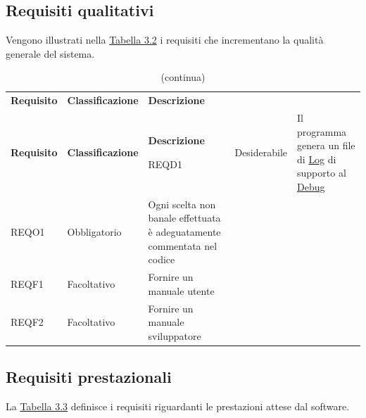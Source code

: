 \newpage
\subsection{Requisiti qualitativi}

Vengono illustrati nella \hyperref[3.2]{Tabella 3.2} i requisiti che incrementano la qualità generale del sistema.


\begin{longtable}{ >{\centering}p{} >{\centering}p{}
		>{\raggedright}p{} >{\centering}p{}}
	\caption{Tabella dei requisiti qualitativi}
	\label{3.2}
	\\
	\rowcolorhead 
	\textbf{\color{white}Requisito} 
	& \textbf{\color{white}Classificazione} 
	& \centering\textbf{\color{white}Descrizione}
	 
	\endfirsthead
	\caption[]{(continua)}\\
	\rowcolorhead 
	\textbf{\color{white}Requisito} 
	& \textbf{\color{white}Classificazione} 
	& \centering\textbf{\color{white}Descrizione}
	
	\endhead	
	
	REQD1	&	Desiderabile	&	Il programma genera un file di \hyperref[Log]{Log\glo} di supporto al \hyperref[Debug]{Debug\glo}	 \tabularnewline
	REQO1	&	Obbligatorio	&	Ogni scelta non banale effettuata è adeguatamente commentata nel codice	\tabularnewline
	REQF1	&	Facoltativo		&	Fornire un manuale utente	\tabularnewline
	REQF2	&	Facoltativo		&	Fornire un manuale sviluppatore	\tabularnewline

\end{longtable}

\subsection{Requisiti prestazionali}

La \hyperref[3.3]{Tabella 3.3} definisce i requisiti riguardanti le prestazioni attese dal software.


